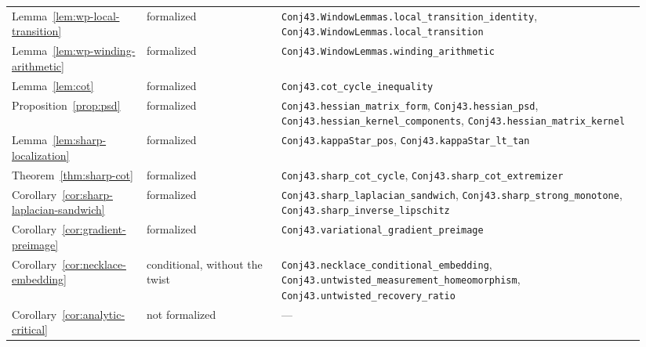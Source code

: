 \documentclass[11pt]{article}
\theoremstyle{definition}
\begin{document}
\begin{longtable}{@{}>{\raggedright\arraybackslash}p{0.2\linewidth}>{\raggedright\arraybackslash}p{0.2\linewidth}>{\raggedright\arraybackslash}p{0.54\linewidth}@{}}
Lemma~\ref{lem:wp-local-transition} & formalized & \texttt{Conj43.\allowbreak WindowLemmas.\allowbreak local\_\allowbreak transition\_\allowbreak identity}, \texttt{Conj43.\allowbreak WindowLemmas.\allowbreak local\_\allowbreak transition} \\
Lemma~\ref{lem:wp-winding-arithmetic} & formalized & \texttt{Conj43.\allowbreak WindowLemmas.\allowbreak winding\_\allowbreak arithmetic} \\
Lemma~\ref{lem:cot} & formalized & \texttt{Conj43.\allowbreak cot\_\allowbreak cycle\_\allowbreak inequality} \\
Proposition~\ref{prop:psd} & formalized & \texttt{Conj43.\allowbreak hessian\_\allowbreak matrix\_\allowbreak form}, \texttt{Conj43.\allowbreak hessian\_\allowbreak psd}, \texttt{Conj43.\allowbreak hessian\_\allowbreak kernel\_\allowbreak components}, \texttt{Conj43.\allowbreak hessian\_\allowbreak matrix\_\allowbreak kernel} \\
Lemma~\ref{lem:sharp-localization} & formalized & \texttt{Conj43.\allowbreak kappaStar\_\allowbreak pos}, \texttt{Conj43.\allowbreak kappaStar\_\allowbreak lt\_\allowbreak tan} \\
Theorem~\ref{thm:sharp-cot} & formalized & \texttt{Conj43.\allowbreak sharp\_\allowbreak cot\_\allowbreak cycle}, \texttt{Conj43.\allowbreak sharp\_\allowbreak cot\_\allowbreak extremizer} \\
Corollary~\ref{cor:sharp-laplacian-sandwich} & formalized & \texttt{Conj43.\allowbreak sharp\_\allowbreak laplacian\_\allowbreak sandwich}, \texttt{Conj43.\allowbreak sharp\_\allowbreak strong\_\allowbreak monotone}, \texttt{Conj43.\allowbreak sharp\_\allowbreak inverse\_\allowbreak lipschitz} \\
Corollary~\ref{cor:gradient-preimage} & formalized & \texttt{Conj43.\allowbreak variational\_\allowbreak gradient\_\allowbreak preimage} \\
Corollary~\ref{cor:necklace-embedding} & conditional, without the twist & \texttt{Conj43.\allowbreak necklace\_\allowbreak conditional\_\allowbreak embedding}, \texttt{Conj43.\allowbreak untwisted\_\allowbreak measurement\_\allowbreak homeomorphism}, \texttt{Conj43.\allowbreak untwisted\_\allowbreak recovery\_\allowbreak ratio} \\
Corollary~\ref{cor:analytic-critical} & not formalized & --- \\
\hline
\end{longtable}
\end{document}
